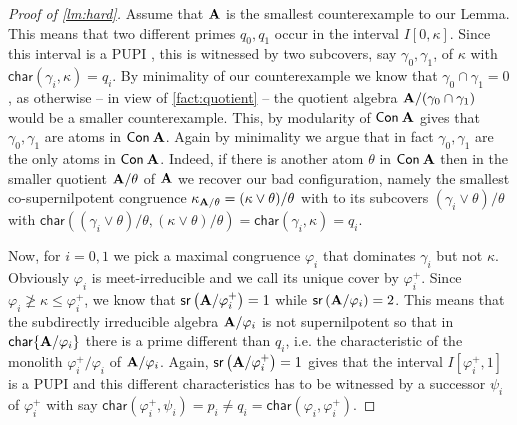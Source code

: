 \documentclass[11pt,a4paper]{amsart}
\newcommand{\m}[1]{{\uppercase {\bf{#1}}}}
\newcommand{\set}[1]{{\left\{ {#1} \right\} }}
\newcommand{\intv}[2]{I\left[#1,#2\right]}
\renewcommand{\leq}{\leqslant}
\renewcommand{\geq}{\geqslant}
\newcommand{\join}{\vee}
\newcommand{\con}[1]{{\sf Con\:\m{#1}}}
\newcommand{\fj}{\varphi}
\newcommand{\pupi}{PUPI }
\newcommand{\sr}[1]{{\mathsf{sr}\left(#1\right)}}
\newcommand{\charr}{\mathsf{char}}
\newcommand{\charrset}[1]{\charr\set{#1}}
\newcommand{\gammai}{\gamma_i}
\newcommand{\gammaz}{\gamma_0}
\newcommand{\gammaj}{\gamma_1}
\newcommand{\fji}{\fj_i}
\newcommand{\fjpi}{\fj^+_i}
\newcommand{\psii}{\psi_i}
\begin{document}
\begin{proof}[Proof of \cref{lm:hard}]
Assume that $\m A$ is the smallest counterexample to our Lemma.
This means that two different primes $q_0,q_1$  occur in the interval $\intv{0}{\kappa}$.
Since this interval is a \pupi, 
this is witnessed by two subcovers, say $\gammaz,\gammaj$, of $\kappa$ with $\charr(\gammai,\kappa)=q_i$.
By minimality of our counterexample we know that $\gammaz\cap\gammaj=0$, as otherwise
-- in view of \cref{fact:quotient} --
the quotient algebra $\m A/(\gammaz\cap\gammaj)$ would be a smaller counterexample.
This, by modularity of $\con{A}$ gives that $\gammaz,\gammaj$ are atoms in $\con{A}$.
Again by minimality we argue that in fact  $\gammaz,\gammaj$ are the only atoms in $\con{A}$.
Indeed, if there is another atom $\theta$ in $\con{A}$
then in the smaller quotient $\m A/\theta$ of $\m A$ we recover our bad configuration,
namely the smallest co-supernilpotent congruence $\kappa_{\m A/\theta}=(\kappa\join\theta)/\theta$ with to its subcovers $(\gammai\join\theta)/\theta$ with $\charr((\gammai\join\theta)/\theta,(\kappa\join\theta)/\theta)=\charr(\gammai,\kappa)=q_i$.





Now, for $i=0,1$ we pick a maximal congruence $\fji$ that dominates $\gammai$ but not $\kappa$.
Obviously $\fji$ is meet-irreducible and we call its unique cover by $\fjpi$.
Since $\fji\not\geq\kappa\leq\fjpi$, we know that $\sr{\m A/\fjpi}=1$ while $\sr{\m A/\fji}=2$.
This means that the subdirectly irreducible algebra $\m A/\fji$ is not supernilpotent
so that in $\charrset{\m A/\fji}$ there is a prime different than $q_i$,
i.e. the characteristic of the monolith $\fjpi/\fji$ of $\m A/\fji$.
Again, $\sr{\m A/\fjpi}=1$ gives that the interval
$\intv{\fjpi}{1}$ is a \pupi and this different characteristics has to be witnessed by a
successor $\psii$ of $\fjpi$ with say $\charr(\fjpi,\psii)=p_i\neq q_i=\charr(\fji,\fjpi)$.


\end{proof}
\end{document}
